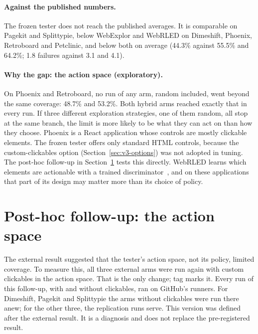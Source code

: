 \paragraph{Against the published numbers.} The frozen tester does not reach the published
averages. It is comparable on Pagekit and Splittypie, below WebExplor and WebRLED on
Dimeshift, Phoenix, Retroboard and Petclinic, and below both on average (44.3\% against
55.5\% and 64.2\%; 1.8 failures against 3.1 and 4.1).

\paragraph{Why the gap: the action space (exploratory).} On Phoenix and Retroboard, no run
of any arm, random included, went beyond the same coverage: 48.7\% and 53.2\%. Both hybrid
arms reached exactly that in every run. If three different exploration strategies, one of
them random, all stop at the same branch, the limit is more likely to be what they can act
on than how they choose. Phoenix is a React application whose controls are mostly
clickable  elements. The frozen tester offers only standard HTML controls,
because the custom-clickables option (Section~\ref{sec:v3-options}) was not adopted in
tuning. The post-hoc follow-up in Section~\ref{sec:followup} tests this directly. WebRLED
learns which elements are actionable with a trained discriminator~\cite{gu2025webrled}, and
on these applications that part of its design may matter more than its choice of policy.

\section{Post-hoc follow-up: the action space}
\label{sec:followup}

The external result suggested that the tester's action space, not its policy, limited
coverage. To measure this, all three external arms were run again with custom clickables in
the action space. That is the only change; tag  marks it. Every run of
this follow-up, with and without clickables, ran on GitHub's runners. For Dimeshift, Pagekit
and Splittypie the arms without clickables were run there anew; for the other three, the
replication runs serve. This version was defined after the external result. It is a
diagnosis and does not replace the pre-registered result.

